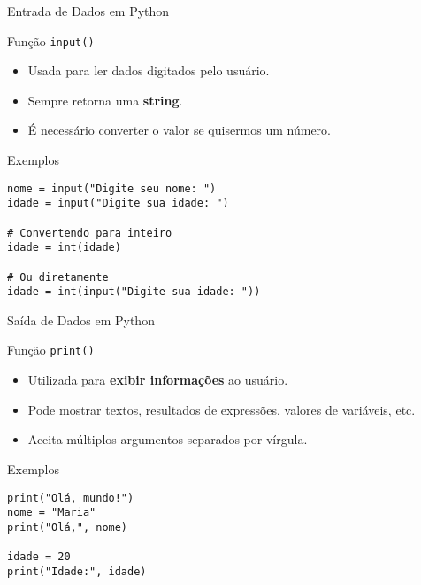 \begin{frame}[fragile]{Entrada de Dados em Python}

\begin{block}{Função \texttt{input()}}
\begin{itemize}
    \item Usada para ler dados digitados pelo usuário.
    \item Sempre retorna uma \textbf{string}.
    \item É necessário converter o valor se quisermos um número.
\end{itemize}
\end{block}

\vspace{1em}

\begin{block}{Exemplos}
\begin{verbatim}
nome = input("Digite seu nome: ")
idade = input("Digite sua idade: ")

# Convertendo para inteiro
idade = int(idade)

# Ou diretamente
idade = int(input("Digite sua idade: "))
\end{verbatim}
\end{block}

\end{frame}


\begin{frame}[fragile]{Saída de Dados em Python}

\begin{block}{Função \texttt{print()}}
\begin{itemize}
    \item Utilizada para \textbf{exibir informações} ao usuário.
    \item Pode mostrar textos, resultados de expressões, valores de variáveis, etc.
    \item Aceita múltiplos argumentos separados por vírgula.
\end{itemize}
\end{block}

\vspace{1em}

\begin{block}{Exemplos}
\begin{verbatim}
print("Olá, mundo!")
nome = "Maria"
print("Olá,", nome)

idade = 20
print("Idade:", idade)
\end{verbatim}
\end{block}

\end{frame}
